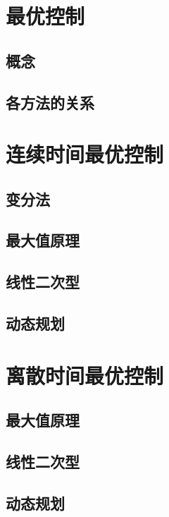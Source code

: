 \documentclass[
12pt, %
a4paper, 
oneside, %
headinclude,footinclude, %
]{scrartcl}
\begin{document}
\section{最优控制}
\subsection[概念]{概念}
\subsection[各方法的关系]{各方法的关系}
\section{连续时间最优控制}
\subsection[变分法]{变分法}
\subsection[最大值原理]{最大值原理}
\subsection[线性二次型]{线性二次型}
\subsection[动态规划]{动态规划}
\section{离散时间最优控制}
\subsection[最大值原理]{最大值原理}
\subsection[线性二次型]{线性二次型}
\subsection[动态规划]{动态规划}
\end{document}
